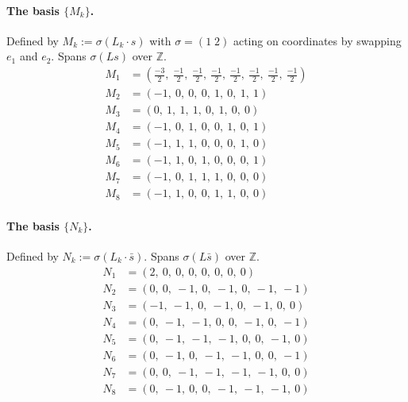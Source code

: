 \documentclass[twoside,english]{paper}
\numberwithin{equation}{section}
\numberwithin{figure}{section}
\theoremstyle{definition}
\theoremstyle{remark}
\newcommand{\ZZ}{\mathbb{Z}}
\begin{document}
\paragraph{The basis $\{M_k\}$.} Defined by $M_k := \sigma(L_k \cdot s)$ with $\sigma = (1\;2)$ acting on coordinates by swapping $e_1$ and $e_2$. Spans $\sigma(Ls)$ over $\ZZ$.
\begin{align*}
  M_{1} &= (\tfrac{-3}{2},\ \tfrac{-1}{2},\ \tfrac{-1}{2},\ \tfrac{-1}{2},\ \tfrac{-1}{2},\ \tfrac{-1}{2},\ \tfrac{-1}{2},\ \tfrac{-1}{2}) \\
  M_{2} &= (-1,\ 0,\ 0,\ 0,\ 1,\ 0,\ 1,\ 1) \\
  M_{3} &= (0,\ 1,\ 1,\ 1,\ 0,\ 1,\ 0,\ 0) \\
  M_{4} &= (-1,\ 0,\ 1,\ 0,\ 0,\ 1,\ 0,\ 1) \\
  M_{5} &= (-1,\ 1,\ 1,\ 0,\ 0,\ 0,\ 1,\ 0) \\
  M_{6} &= (-1,\ 1,\ 0,\ 1,\ 0,\ 0,\ 0,\ 1) \\
  M_{7} &= (-1,\ 0,\ 1,\ 1,\ 1,\ 0,\ 0,\ 0) \\
  M_{8} &= (-1,\ 1,\ 0,\ 0,\ 1,\ 1,\ 0,\ 0)
\end{align*}

\paragraph{The basis $\{N_k\}$.} Defined by $N_k := \sigma(L_k \cdot \bar s)$. Spans $\sigma(L\bar s)$ over $\ZZ$.
\begin{align*}
  N_{1} &= (2,\ 0,\ 0,\ 0,\ 0,\ 0,\ 0,\ 0) \\
  N_{2} &= (0,\ 0,\ -1,\ 0,\ -1,\ 0,\ -1,\ -1) \\
  N_{3} &= (-1,\ -1,\ 0,\ -1,\ 0,\ -1,\ 0,\ 0) \\
  N_{4} &= (0,\ -1,\ -1,\ 0,\ 0,\ -1,\ 0,\ -1) \\
  N_{5} &= (0,\ -1,\ -1,\ -1,\ 0,\ 0,\ -1,\ 0) \\
  N_{6} &= (0,\ -1,\ 0,\ -1,\ -1,\ 0,\ 0,\ -1) \\
  N_{7} &= (0,\ 0,\ -1,\ -1,\ -1,\ -1,\ 0,\ 0) \\
  N_{8} &= (0,\ -1,\ 0,\ 0,\ -1,\ -1,\ -1,\ 0)
\end{align*}
\end{document}

